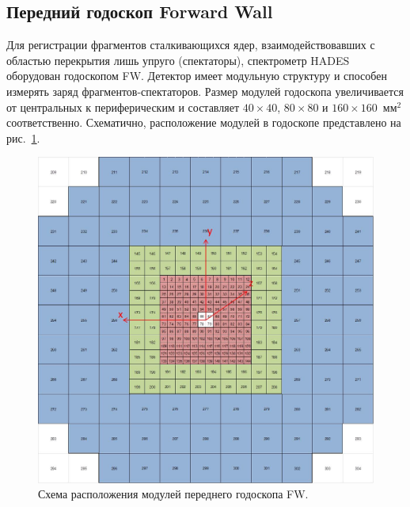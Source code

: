 \subsection{Передний годоскоп Forward Wall}

Для регистрации фрагментов сталкивающихся ядер, взаимодействовавших с областью перекрытия лишь упруго (спектаторы), спектрометр HADES оборудован годоскопом FW.
Детектор имеет модульную структуру и способен измерять заряд фрагментов-спектаторов.
Размер модулей годоскопа увеличивается от центральных к периферическим и составляет $40\times40$, $80\times80$ и $160\times160$~мм$^2$ соответственно.
Схематично, расположение модулей в годоскопе представлено на рис.~\ref{fig:hodo_layout}.
%
\begin{figure}[ht]
\begin{center}
\includegraphics[width=0.55\linewidth]{images/FW_layout.jpg}
\caption{Схема расположения модулей переднего годоскопа FW.}
\label{fig:hodo_layout}
\end{center}
\end{figure}

